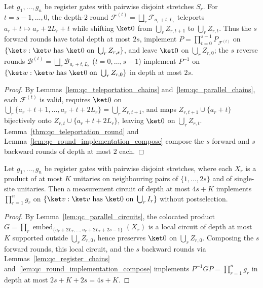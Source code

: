 \begin{lemma}
    Let $g_1,\dots,g_n$ be register gates with pairwise disjoint stretches $S_r$. For $t=s-1,\dots,0$, the depth-$2$ round $\mathcal F^{(t)}=\bigsqcup_r\mathcal F_{a_r+t,L_r}$ teleports $a_r+t\mapsto a_r+2L_r+t$ while shifting $\ket0$ from $\bigcup_r Z_{r,t+1}$ to $\bigcup_r Z_{r,t}$. Thus the $s$ forward rounds have total depth at most $2s$, implement $P=\prod_{t=0}^{s-1}P_{\mathcal F^{(t)}}$ on $\{\ket v:\ket v\text{ has }\ket0\text{ on }\bigcup_r Z_{r,s}\}$, and leave $\ket0$ on $\bigcup_r Z_{r,0}$; the $s$ reverse rounds $\mathcal B^{(t)}=\bigsqcup_r\mathcal B_{a_r+t,L_r}$ ($t=0,\dots,s-1$) implement $P^{-1}$ on $\{\ket w:\ket w\text{ has }\ket0\text{ on }\bigcup_r Z_{r,0}\}$ in depth at most $2s$.
\end{lemma}
\begin{proof}
    \leanok
    By Lemmas~\ref{lem:qc_teleportation_chains} and~\ref{lem:qc_parallel_chains}, each $\mathcal F^{(t)}$ is valid, requires $\ket0$ on $\bigcup_r\{a_r+t+1,\dots,a_r+t+2L_r\}=\bigcup_r Z_{r,t+1}$, and maps $Z_{r,t+1}\cup\{a_r+t\}$ bijectively onto $Z_{r,t}\cup\{a_r+t+2L_r\}$, leaving $\ket0$ on $\bigcup_r Z_{r,t}$. Lemma~\ref{thm:qc_teleportation_round} and Lemma~\ref{lem:qc_round_implementation_compose} compose the $s$ forward and $s$ backward rounds of depth at most $2$ each.
\end{proof}

\begin{lemma}
    \label{thm:qc_register_layer}
    \leanok
    Let $g_1,\dots,g_n$ be register gates with pairwise disjoint stretches, where each $X_r$ is a product of at most $K$ unitaries on neighbouring pairs of $\{1,\dots,2s\}$ and of single-site unitaries. Then a measurement circuit of depth at most $4s+K$ implements $\prod_{r=1}^n g_r$ on $\{\ket v:\ket v\text{ has }\ket0\text{ on }\bigcup_r I_r\}$ without postselection.
\end{lemma}
\begin{proof}
    \leanok
    By Lemma~\ref{lem:qc_parallel_circuits}, the colocated product $G=\prod_r\operatorname{embed}_{\{a_r+2L_r,\dots,a_r+2L_r+2s-1\}}(X_r)$ is a local circuit of depth at most $K$ supported outside $\bigcup_r Z_{r,0}$, hence preserves $\ket0$ on $\bigcup_r Z_{r,0}$. Composing the $s$ forward rounds, this local circuit, and the $s$ backward rounds via Lemmas~\ref{lem:qc_register_chains} and~\ref{lem:qc_round_implementation_compose} implements $P^{-1}GP=\prod_{r=1}^n g_r$ in depth at most $2s+K+2s=4s+K$.
\end{proof}
